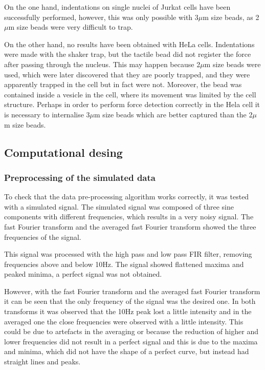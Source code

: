 \documentclass[12pt, a4paper]{article} %
\begin{document}
\setlength{\parskip}{4mm}

On the one hand, indentations on single nuclei of Jurkat cells have been successfully performed, however, this was only possible with 3$\mu$m size beads, as 2$\mu$m size beads were very difficult to trap. 

On the other hand, no results have been obtained with HeLa cells. Indentations were made with the shaker trap, but the tactile bead did not register the force after passing through the nucleus. This may happen because 2$\mu$m size beads were used, which were later discovered that they are poorly trapped, and they were apparently trapped in the cell but in fact were not. Moreover, the bead was contained inside a vesicle in the cell, where its movement was limited by the cell structure. Perhaps in order to perform force detection correctly in the Hela cell it is necessary to internalise 3$\mu$m size beads which are better captured than the 2$\mu$m size beads.

\setlength{\parskip}{0mm}

\subsection{Computational desing}

\subsubsection{Preprocessing of the simulated data}

To check that the data pre-processing algorithm works correctly, it was tested with a simulated signal. The simulated signal was composed of three sine components with different frequencies, which results in a very noisy signal. The fast Fourier transform and the averaged fast Fourier transform showed the three frequencies of the signal. 

\setlength{\parskip}{4mm}

This signal was processed with the high pass and low pass FIR filter, removing frequencies above and below 10Hz. The signal showed flattened maxima and peaked minima, a perfect signal was not obtained.

However, with the fast Fourier transform and the averaged fast Fourier transform it can be seen that the only frequency of the signal was the desired one. In both transforms it was observed that the 10Hz peak lost a little intensity and in the averaged one the close frequencies were observed with a little intensity. This could be due to artefacts in the averaging or because the reduction of higher and lower frequencies did not result in a perfect signal and this is due to the maxima and minima, which did not have the shape of a perfect curve, but instead had straight lines and peaks.
\end{document}
